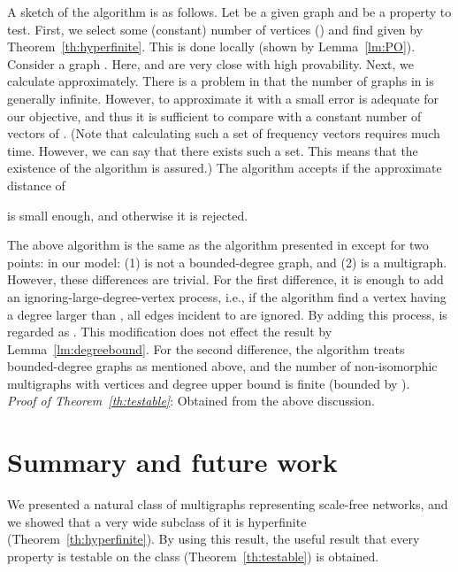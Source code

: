 \documentclass[11pt]{article}
\newcommand{\qed}{\hspace*{\fill} }
\begin{document}
A sketch of the algorithm is as follows. 
Let  be a given graph and 
 be a property to test. 
First, we select some (constant) number  
of vertices  () and 
find  given by Theorem~\ref{th:hyperfinite}. 
This is done locally (shown by Lemma~\ref{lm:PO}).
Consider a graph 
. 
Here,  and  
are very close with high provability. 
Next, we calculate  approximately. 
There is a problem in that the number of graphs in  is generally 
infinite. However, to approximate it with a small error is 
adequate for our objective, and thus it is sufficient to compare  with 
a constant number of vectors of . 
(Note that calculating such a set of frequency vectors requires much time. 
However, we can say that there exists such a set.  
This means that the existence of the algorithm is assured.) 
The algorithm accepts  
if the approximate distance of 

is small enough, and otherwise it is rejected. 

The above algorithm is the same as the algorithm 
presented in \cite{NS_Testable_SJCOMP13} 
except for two points: in our model: 
(1)  is not a bounded-degree graph, and 
(2)  is a multigraph. 
However, these differences are trivial. 
For the first difference, it is enough to add an ignoring-large-degree-vertex process, 
i.e., if the algorithm find a vertex  having a degree 
larger than , 
all edges incident to  are ignored.  
By adding this process, 
 is regarded as . 
This modification does not effect the result 
by Lemma~\ref{lm:degreebound}. 
For the second difference, 
the algorithm treats bounded-degree graphs as mentioned above, 
and the number of non-isomorphic multigraphs 
with  vertices and degree upper bound 
 is finite 
(bounded by 
). \\



\noindent
{\em Proof of Theorem~\ref{th:testable}}: 
Obtained from the above discussion. \qed



\section{Summary and future work}

We presented a natural class of multigraphs 
representing scale-free networks, and we showed that a very wide subclass of it is hyperfinite (Theorem~\ref{th:hyperfinite}). 
By using this result, the useful result that every property is testable on the class (Theorem~\ref{th:testable}) is obtained. 
\end{document}

